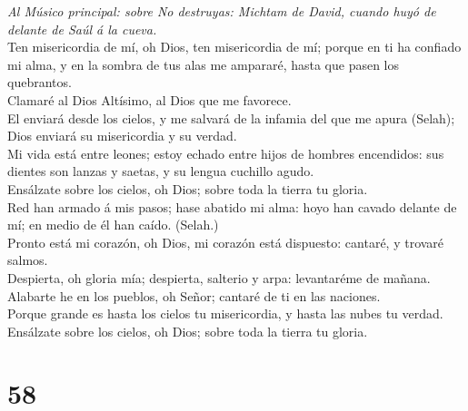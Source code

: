  \emph{Al Músico principal: sobre No destruyas: Michtam de
David, cuando huyó de delante de Saúl á la cueva.}\\
Ten misericordia de mí, oh Dios, ten misericordia de mí; porque en ti ha
confiado mi alma, y en la sombra de tus alas me ampararé, hasta que
pasen los quebrantos.\\
 Clamaré al Dios Altísimo, al Dios que me favorece.\\
 El enviará desde los cielos, y me salvará de la infamia del
que me apura (Selah); Dios enviará su misericordia y su verdad.\\
 Mi vida está entre leones; estoy echado entre hijos de
hombres encendidos: sus dientes son lanzas y saetas, y su lengua
cuchillo agudo.\\
 Ensálzate sobre los cielos, oh Dios; sobre toda la tierra
tu gloria.\\
 Red han armado á mis pasos; hase abatido mi alma: hoyo han
cavado delante de mí; en medio de él han caído. (Selah.)\\
 Pronto está mi corazón, oh Dios, mi corazón está dispuesto:
cantaré, y trovaré salmos.\\
 Despierta, oh gloria mía; despierta, salterio y arpa:
levantaréme de mañana.\\
 Alabarte he en los pueblos, oh Señor; cantaré de ti en las
naciones.\\
 Porque grande es hasta los cielos tu misericordia, y hasta
las nubes tu verdad.\\
 Ensálzate sobre los cielos, oh Dios; sobre toda la tierra
tu gloria.

\hypertarget{section-57}{%
\section{58}\label{section-57}}

